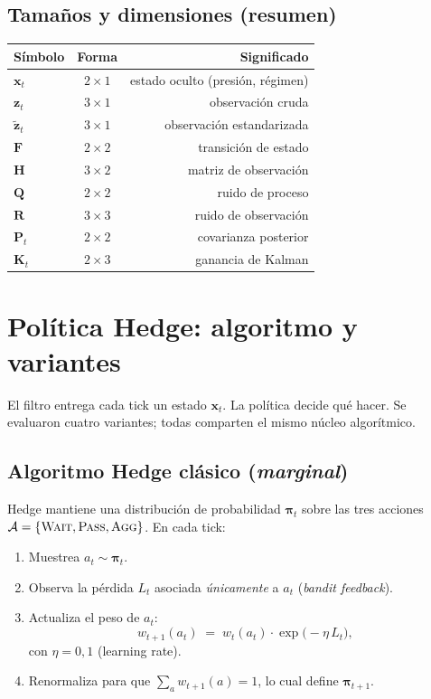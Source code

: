 \documentclass[journal,onecolumn,11pt]{IEEEtran}
\newcommand{\xv}{\mathbf{x}}
\newcommand{\zv}{\mathbf{z}}
\newcommand{\Fm}{\mathbf{F}}
\newcommand{\Hm}{\mathbf{H}}
\newcommand{\Qm}{\mathbf{Q}}
\newcommand{\Rm}{\mathbf{R}}
\newcommand{\Pm}{\mathbf{P}}
\newcommand{\Km}{\mathbf{K}}
\begin{document}
\subsection{Tamaños y dimensiones (resumen)}

\begin{center}
\begin{tabular}{lcr}
\toprule
Símbolo & Forma & Significado \\
\midrule
$\xv_t$        & $2\!\times\!1$ & estado oculto (presión, régimen)\\
$\zv_t$        & $3\!\times\!1$ & observación cruda \\
$\tilde{\zv}_t$& $3\!\times\!1$ & observación estandarizada \\
$\Fm$          & $2\!\times\!2$ & transición de estado \\
$\Hm$          & $3\!\times\!2$ & matriz de observación \\
$\Qm$          & $2\!\times\!2$ & ruido de proceso \\
$\Rm$          & $3\!\times\!3$ & ruido de observación \\
$\Pm_t$        & $2\!\times\!2$ & covarianza posterior \\
$\Km_t$        & $2\!\times\!3$ & ganancia de Kalman \\
\bottomrule
\end{tabular}
\end{center}

\section{Política Hedge: algoritmo y variantes}\label{sec:hedge}

El filtro entrega cada tick un estado $\xv_t$. La política decide qué
hacer. Se evaluaron cuatro variantes; todas comparten el mismo núcleo
algorítmico.

\subsection{Algoritmo Hedge clásico (\emph{marginal})}

Hedge mantiene una distribución de probabilidad $\bm{\pi}_t$ sobre
las tres acciones $\mathcal{A}=\{\textsc{Wait},\textsc{Pass},\textsc{Agg}\}$.
En cada tick:
\begin{enumerate}
\item Muestrea $a_t \sim \bm{\pi}_t$.
\item Observa la pérdida $L_t$ asociada \emph{únicamente} a $a_t$
      (\emph{bandit feedback}).
\item Actualiza el peso de $a_t$:
\begin{equation}
w_{t+1}(a_t) \;=\; w_t(a_t) \cdot \exp\bigl(-\eta\,L_t\bigr),
\label{eq:hedge-update}
\end{equation}
con $\eta=0{,}1$ (learning rate).
\item Renormaliza para que $\sum_a w_{t+1}(a) = 1$, lo cual define
      $\bm{\pi}_{t+1}$.
\end{enumerate}
\end{document}
